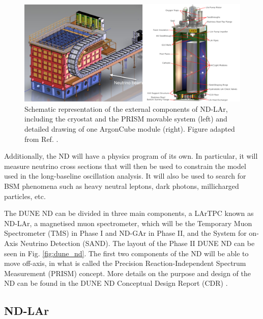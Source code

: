 \begin{figure}[t]
	\centering
	\includegraphics[width=0.99\linewidth]{Images/DUNE/ND/nd_lar_mod}
	\caption[Schematic representation of the external components of ND-LAr, including the cryostat and the PRISM movable system and detailed drawing of one ArgonCube module.]{Schematic representation of the external components of ND-LAr, including the cryostat and the PRISM movable system (left) and detailed drawing of one ArgonCube module (right). Figure adapted from Ref. \cite{DUNE2020TDR1}.}
	\label{fig:dune_nd_lar}
\end{figure}

Additionally, the ND will have a physics program of its own. In particular, it will measure neutrino cross sections that will then be used to constrain the model used in the long-baseline oscillation analysis. It will also be used to search for BSM phenomena such as heavy neutral leptons, dark photons, millicharged particles, etc.

The DUNE ND can be divided in three main components, a LArTPC known as ND-LAr, a magnetised muon spectrometer, which will be the Temporary Muon Spectrometer (TMS) in Phase I and ND-GAr in Phase II, and the System for on-Axis Neutrino Detection (SAND). The layout of the Phase II DUNE ND can be seen in Fig. \ref{fig:dune_nd}. The first two components of the ND will be able to move off-axis, in what is called the Precision Reaction-Independent Spectrum Measurement (PRISM) concept. More details on the purpose and design of the ND can be found in the DUNE ND Conceptual Design Report (CDR) \cite{DUNE2021NDCDR}.

\subsection{ND-LAr}

